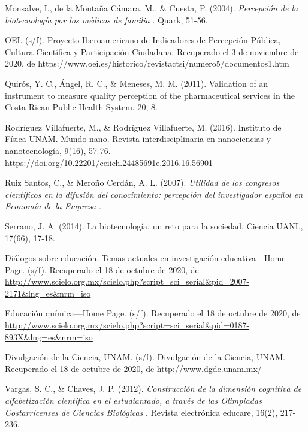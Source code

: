 \documentclass[12pt]{article}
\begin{document}
\begin{thebibliography}{X}
	 Monsalve, I., de la Montaña Cámara, M., \& Cuesta, P. (2004). \textit{ Percepción de la biotecnología por los médicos de familia }. Quark, 51-56.

	 OEI. (s/f). Proyecto Iberoamericano de Indicadores de Percepción Pública, Cultura Científica y Participación Ciudadana. Recuperado el 3 de noviembre de 2020, de https://www.oei.es/historico/revistactsi/numero5/documentos1.htm
	
	 Quirós, Y. C., Ángel, R. C., \& Meneses, M. M. (2011). Validation of an instrument to measure quality perception of the pharmaceutical services in the Costa Rican Public Health System. 20, 8.
	
	\bibitem[Rodriguez, 2016]{}  Rodríguez Villafuerte, M., \& Rodríguez Villafuerte, M. (2016). Instituto de Física-UNAM. Mundo nano. Revista interdisciplinaria en nanociencias y nanotecnología, 9(16), 57-76. \url{https://doi.org/10.22201/ceiich.24485691e.2016.16.56901}
	
	 Ruiz Santos, C., \& Meroño Cerdán, A. L. (2007). \textit{ Utilidad de los congresos científicos en la difusión del conocimiento: percepción del investigador español en Economía de la Empresa }.
	
	 Serrano, J. A. (2014). La biotecnología, un reto para la sociedad. Ciencia UANL, 17(66), 17-18.
	
	 Diálogos sobre educación. Temas actuales en investigación educativa—Home Page. (s/f). Recuperado el 18 de octubre de 2020, de \url{http://www.scielo.org.mx/scielo.php?script=sci_serial&pid=2007-2171&lng=es&nrm=iso}
	
	 Educación química—Home Page. (s/f). Recuperado el 18 de octubre de 2020, de \url{http://www.scielo.org.mx/scielo.php?script=sci_serial&pid=0187-893X&lng=es&nrm=iso}
	
	 Divulgación de la Ciencia, UNAM. (s/f). Divulgación de la Ciencia, UNAM. Recuperado el 18 de octubre de 2020, de \url{http://www.dgdc.unam.mx/}
	
	Vargas, S. C., \& Chaves, J. P. (2012). \textit{ Construcción de la dimensión cognitiva de alfabetización científica en el estudiantado, a través de las Olimpiadas Costarricenses de Ciencias Biológicas }. Revista electrónica educare, 16(2), 217-236.
	

\end{thebibliography}
\end{document}
